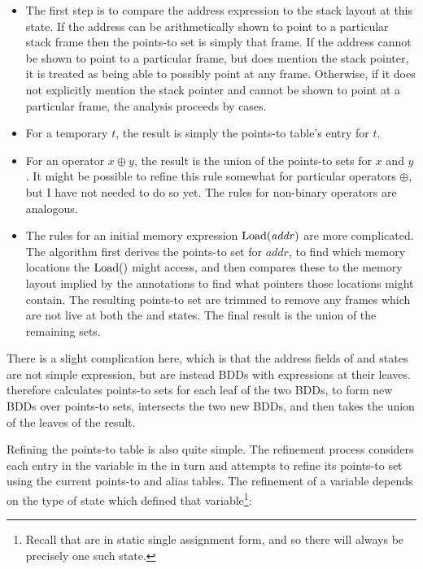 \begin{itemize}
\item
  The first step is to compare the address expression to the stack
  layout at this state.  If the address can be arithmetically shown to
  point to a particular stack frame then the points-to set is simply
  that frame.  If the address cannot be shown to point to a particular
  frame, but does mention the stack pointer, it is treated as being
  able to possibly point at any frame.  Otherwise, if it does not
  explicitly mention the stack pointer and cannot be shown to point at
  a particular frame, the analysis proceeds by cases.  
\item
  For a {\StateMachine} temporary $t$, the result is simply the
  points-to table's entry for $t$.
\item
  For an operator $x \oplus y$, the result is the union of the
  points-to sets for $x$ and $y$.  It might be possible to refine this
  rule somewhat for particular operators $\oplus$, but I have not
  needed to do so yet.  The rules for non-binary operators are
  analogous.
\item
  The rules for an initial memory expression $\mathrm{Load}(\mathit{addr})$
  are more complicated.  The algorithm first derives the points-to set
  for $\mathit{addr}$, to find which memory locations the $\mathrm{Load}()$
  might access, and then compares these to the memory layout implied
  by the  annotations to find what pointers those
  locations might contain.  The resulting points-to set are trimmed to
  remove any frames which are not live at both the  and
   states.  The final result is the union of the
  remaining sets.  
\end{itemize}

There is a slight complication here, which is that the address fields
of  and  states are not simple expression,
but are instead BDDs with expressions at their leaves.
{\Implementation} therefore calculates points-to sets for each leaf of
the two BDDs, to form new BDDs over points-to sets, intersects the two
new BDDs, and then takes the union of the leaves of the result.

Refining the points-to table is also quite simple.  The refinement
process considers each entry in the variable in the {\StateMachine} in
turn and attempts to refine its points-to set using the current
points-to and alias tables.  The refinement of a variable depends on
the type of state which defined that variable\footnote{Recall that
  {\StateMachines} are in static single assignment form, and so there
  will always be precisely one such state.}:

